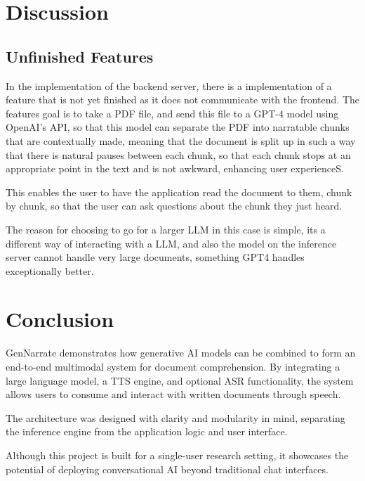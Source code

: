 \documentclass[twocolumn]{article}
\begin{document}
\section{Discussion}
\subsection{Unfinished Features}
In the implementation of the backend server, there is a implementation of a feature that is not yet finished as it does not communicate with the frontend. The features goal is to take a PDF file, and send this file to a GPT-4 model using OpenAI's API, so that this model can separate the PDF into narratable chunks that are contextually made, meaning that the document is split up in such a way that there is natural pauses between each chunk, so that each chunk stops at an appropriate point in the text and is not awkward, enhancing user experienceS.

This enables the user to have the application read the document to them, chunk by chunk, so that the user can ask questions about the chunk they just heard. 

The reason for choosing to go for a larger LLM in this case is simple, its a different way of interacting with a LLM, and also the model on the inference server cannot handle very large documents, something GPT4 handles exceptionally better.

\section{Conclusion}
GenNarrate demonstrates how generative AI models can be combined to form an end-to-end multimodal system for document comprehension. By integrating a large language model, a TTS engine, and optional ASR functionality, the system allows users to consume and interact with written documents through speech.

The architecture was designed with clarity and modularity in mind, separating the inference engine from the application logic and user interface.

Although this project is built for a single-user research setting, it showcases the potential of deploying conversational AI beyond traditional chat interfaces.

\subsubsection{}


\end{document}
